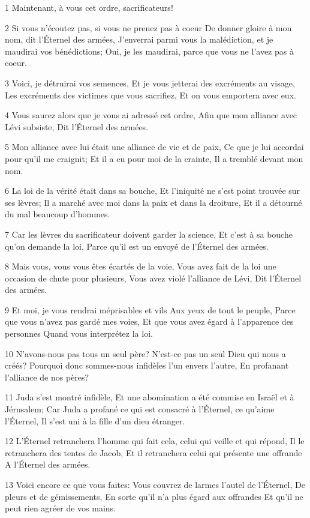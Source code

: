 \par 1 Maintenant, à vous cet ordre, sacrificateurs!
\par 2 Si vous n'écoutez pas, si vous ne prenez pas à coeur De donner gloire à mon nom, dit l'Éternel des armées, J'enverrai parmi vous la malédiction, et je maudirai vos bénédictions; Oui, je les maudirai, parce que vous ne l'avez pas à coeur.
\par 3 Voici, je détruirai vos semences, Et je vous jetterai des excréments au visage, Les excréments des victimes que vous sacrifiez, Et on vous emportera avec eux.
\par 4 Vous saurez alors que je vous ai adressé cet ordre, Afin que mon alliance avec Lévi subsiste, Dit l'Éternel des armées.
\par 5 Mon alliance avec lui était une alliance de vie et de paix, Ce que je lui accordai pour qu'il me craignit; Et il a eu pour moi de la crainte, Il a tremblé devant mon nom.
\par 6 La loi de la vérité était dans sa bouche, Et l'iniquité ne s'est point trouvée sur ses lèvres; Il a marché avec moi dans la paix et dans la droiture, Et il a détourné du mal beaucoup d'hommes.
\par 7 Car les lèvres du sacrificateur doivent garder la science, Et c'est à sa bouche qu'on demande la loi, Parce qu'il est un envoyé de l'Éternel des armées.
\par 8 Mais vous, vous vous êtes écartés de la voie, Vous avez fait de la loi une occasion de chute pour plusieurs, Vous avez violé l'alliance de Lévi, Dit l'Éternel des armées.
\par 9 Et moi, je vous rendrai méprisables et vils Aux yeux de tout le peuple, Parce que vous n'avez pas gardé mes voies, Et que vous avez égard à l'apparence des personnes Quand vous interprétez la loi.
\par 10 N'avons-nous pas tous un seul père? N'est-ce pas un seul Dieu qui nous a créés? Pourquoi donc sommes-nous infidèles l'un envers l'autre, En profanant l'alliance de nos pères?
\par 11 Juda s'est montré infidèle, Et une abomination a été commise en Israël et à Jérusalem; Car Juda a profané ce qui est consacré à l'Éternel, ce qu'aime l'Éternel, Il s'est uni à la fille d'un dieu étranger.
\par 12 L'Éternel retranchera l'homme qui fait cela, celui qui veille et qui répond, Il le retranchera des tentes de Jacob, Et il retranchera celui qui présente une offrande A l'Éternel des armées.
\par 13 Voici encore ce que vous faites: Vous couvrez de larmes l'autel de l'Éternel, De pleurs et de gémissements, En sorte qu'il n'a plus égard aux offrandes Et qu'il ne peut rien agréer de vos mains.
